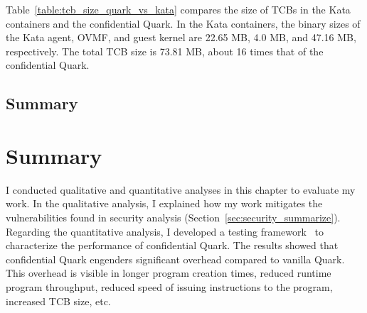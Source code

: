 Table~\ref{table:tcb_size_quark_vs_kata} compares the size of \acrshort{TCB}s in the Kata containers and the confidential Quark. In the Kata containers, the binary sizes of the Kata agent, OVMF, and guest kernel are 22.65 MB, 4.0 MB, and 47.16 MB, respectively. The total \acrshort{TCB} size is 
73.81 MB, about 16 times that of the confidential Quark.

\subsection{Summary}
\label{sec:qualitativ_sum}

\section{Summary}
I conducted qualitative and quantitative analyses in this chapter to evaluate my work. In the qualitative analysis, I explained how my work mitigates the vulnerabilities found in security analysis (Section~\ref{sec:security_summarize}). 
Regarding the quantitative analysis, I developed a testing framework~\cite*{benchamark_framework} to characterize the performance of confidential Quark. The results showed that confidential Quark engenders significant overhead compared to vanilla Quark. 
This overhead is visible in longer program creation times, reduced runtime program throughput, reduced speed of issuing instructions to the program, increased \acrshort{TCB} size, etc.









\cleardoublepage

